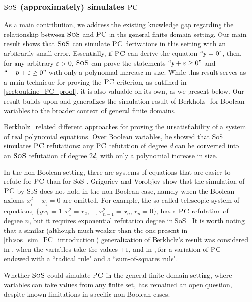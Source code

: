 \documentclass[11pt]{article}
\newcommand{\sos}{\text{\sc{SoS}}}
\newcommand{\PC}{\textsc{PC}}
\newcommand{\1}{\textbf{1}}
\begin{document}
\subsubsection*{$\sos$ (approximately) simulates $\PC$}\label{sect:PC_criterion_introduction}


As a main contribution, we address the existing knowledge gap regarding the relationship between $\sos$ and $\PC$ in the general finite domain setting.
Our main result shows that $\sos$ can simulate $\PC$ derivations in this setting with an arbitrarily small error. Essentially, if $\PC$ can derive the equation $``p=0"$, then, for any arbitrary $\varepsilon>0$, $\sos$ can prove the statements $``p+\varepsilon\geq 0"$ and $``-p+\varepsilon \geq 0"$ with only a polynomial increase in size.
While this result serves as a main technique for proving the $\PC$ criterion, as outlined in \cref{sect:outline_PC_proof}, it is also valuable on its own, as we present below.
Our result builds upon and generalizes the simulation result of Berkholz~\cite{berkholz18} for Boolean variables to the broader context of general finite domains.

Berkholz~\cite{berkholz18} related different approaches for proving the unsatisfiability of a system of real polynomial equations. Over Boolean variables, he showed that SoS simulates $\PC$ refutations: any \(\PC\) refutation of degree \(d\) can be converted into an \(\sos\) refutation of degree \(2d\), with only a polynomial increase in size.

In the non-Boolean setting, there are systems of equations that are easier to refute for $\PC$ than for SoS \cite{GrigorievV01}. Grigoriev and Vorobjov \cite{GrigorievV01} show that the simulation of $\PC$ by SoS does not hold in the non-Boolean case, namely when the Boolean axioms $x_j^2-x_j=0$ are omitted. For example, the so-called telescopic system of equations, $\{ yx_1=1, x_1^2=x_2, \ldots, x_{n-1}^2=x_n, x_n=0\}$, has a $\PC$ refutation of degree $n$, but it requires exponential refutation degree in SoS \cite{GrigorievV01}. It is worth noting that a similar (although much weaker than the one present in \cref{th:sos_sim_PC_introduction}) generalization of Berkholz's result was considered in \cite{Sokolov20}, when the variables take the values $\pm 1$, and in \cite{PartFTT21}, for a variation of $\PC$ endowed with a ``radical rule" and a ``sum-of-squares rule".

Whether $\sos$ could simulate $\PC$ in the general finite domain setting, where variables can take values from any finite set, has remained an open question, despite known limitations in specific non-Boolean cases. 
\end{document}

